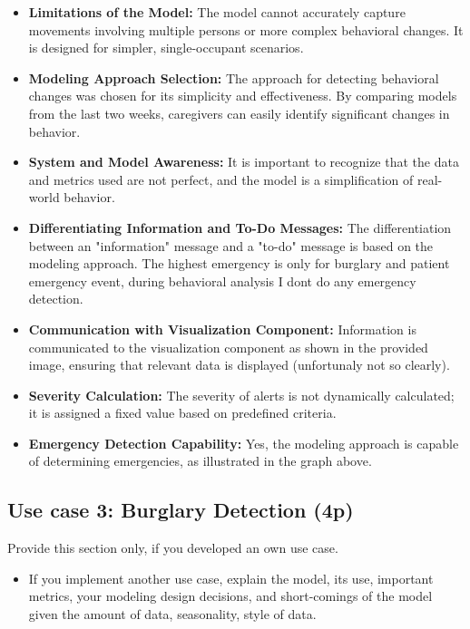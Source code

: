 \documentclass[A4,10pt]{article}
\begin{document}
\begin{itemize}
	\item \textbf{Limitations of the Model:} The model cannot accurately capture movements involving multiple persons or more complex behavioral changes. It is designed for simpler, single-occupant scenarios.
	\item \textbf{Modeling Approach Selection:} The approach for detecting behavioral changes was chosen for its simplicity and effectiveness. By comparing models from the last two weeks, caregivers can easily identify significant changes in behavior.
	\item \textbf{System and Model Awareness:} It is important to recognize that the data and metrics used are not perfect, and the model is a simplification of real-world behavior.
	\item \textbf{Differentiating Information and To-Do Messages:} The differentiation between an "information" message and a "to-do" message is based on the modeling approach. The highest emergency is only for burglary and patient emergency event, during behavioral analysis I dont do any emergency detection.
	\item \textbf{Communication with Visualization Component:} Information is communicated to the visualization component as shown in the provided image, ensuring that relevant data is displayed (unfortunaly not so clearly).
	\item \textbf{Severity Calculation:} The severity of alerts is not dynamically calculated; it is assigned a fixed value based on predefined criteria.
	\item \textbf{Emergency Detection Capability:} Yes, the modeling approach is capable of determining emergencies, as illustrated in the graph above.
\end{itemize}


\subsection{ Use case 3: Burglary Detection (4p)}

Provide this section only, if you developed an own use case.

\begin{itemize}
	\item If you implement another use case, explain the model, its use, important metrics, your modeling design decisions, and short-comings of the model given the amount of data, seasonality, style of data.
\end{itemize}
\end{document}
